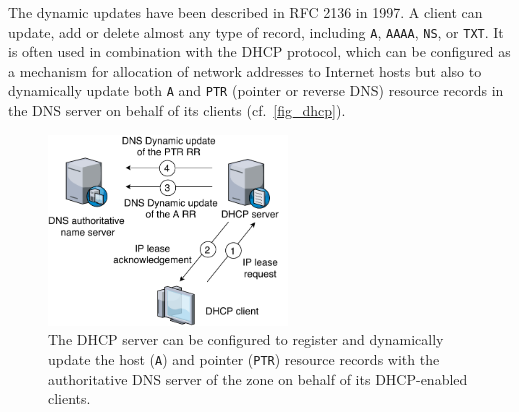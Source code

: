 The dynamic updates have been described in RFC 2136 \cite{rfc2136} in 1997. 
A client can update, add or delete almost any type of record, including \texttt{A}, \texttt{AAAA}, \texttt{NS}, or \texttt{TXT}.
It is often used %
in combination with the DHCP protocol, which can be configured %
as a mechanism for allocation of network addresses to Internet hosts but also to dynamically update both \texttt{A} and \texttt{PTR} (pointer or reverse DNS) resource records in the DNS server %
on behalf of its clients (cf.~\autoref{fig_dhcp}).

\begin{figure}[!ht]
\centering
\includegraphics[width=2.5in]{figs/dhcp.pdf}
\caption{The DHCP server can be configured to register and dynamically update the host (\texttt{A}) and pointer (\texttt{PTR}) resource records with the authoritative DNS server of the zone on behalf of its DHCP-enabled clients.
}
\label{fig_dhcp}
\end{figure}



%



